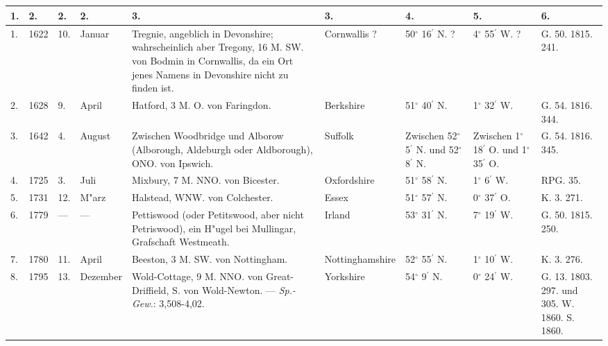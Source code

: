\documentclass[a4paper, 8pt, oneside, polutonikogreek, german]{article}
\begin{document}
\subsection{}
\subsubsection{}
\begin{center}
    \footnotesize
    \begin{longtable}{|p{3mm}|p{7mm}|p{3mm}|p{11mm}|p{30mm}|p{20mm}|p{11mm}|p{11mm}|p{11mm}|}
    \hline
        1. & 2. & 2. & 2. & 3. & 3. & 4. & 5. & 6. \\ \hline
        1. & 1622 & 10. & Januar & Tregnie, angeblich in Devonshire; wahrscheinlich aber Tregony, 16 M. SW. von Bodmin in Cornwallis, da ein Ort jenes Namens in Devonshire nicht zu finden ist. & Cornwallis ? & 50$^\circ$ 16$^\prime$ N. ? & 4$^\circ$ 55$^\prime$ W. ? & G. 50. 1815. 241. \\ \hline
        2. & 1628 & 9. & April & Hatford, 3 M. O. von Faringdon. & Berkshire & 51$^\circ$ 40$^\prime$ N. & 1$^\circ$ 32$^\prime$ W. & G. 54. 1816. 344. \\ \hline
        3. & 1642 & 4. & August & Zwischen Woodbridge und Alborow (Alborough, Aldeburgh oder Aldborough), ONO. von Ipswich. & Suffolk & Zwischen 52$^\circ$ 5$^\prime$ N. und 52$^\circ$ 8$^\prime$ N. & Zwischen 1$^\circ$ 18$^\prime$ O. und 1$^\circ$ 35$^\prime$ O. & G. 54. 1816. 345. \\ \hline
        4. & 1725 & 3. & Juli & Mixbury, 7 M. NNO. von Bicester. & Oxfordshire & 51$^\circ$ 58$^\prime$ N. & 1$^\circ$ 6$^\prime$ W. & RPG. 35. \\ \hline
        5. & 1731 & 12. & M"arz & Halstead, WNW. von Colchester. & Essex & 51$^\circ$ 57$^\prime$ N. & 0$^\circ$ 37$^\prime$ O. & K. 3. 271. \\ \hline
        6. & 1779 & --- & --- & Pettiswood (oder Petitswood, aber nicht Petriswood), ein H"ugel bei Mullingar, Grafschaft Westmeath. & Irland & 53$^\circ$ 31$^\prime$ N. & 7$^\circ$ 19$^\prime$ W. & G. 50. 1815. 250. \\ \hline
        7. & 1780 & 11. & April & Beeston, 3 M. SW. von Nottingham. & Nottinghamshire & 52$^\circ$ 55$^\prime$ N. & 1$^\circ$ 10$^\prime$ W. & K. 3. 276. \\ \hline
        8. & 1795 & 13. & Dezember & Wold-Cottage, 9 M. NNO. von Great-Driffield, S. von Wold-Newton. --- \emph{Sp.-Gew.}: 3,508-4,02. & Yorkshire & 54$^\circ$ 9$^\prime$ N. & 0$^\circ$ 24$^\prime$ W. & G. 13. 1803. 297. und 305. W. 1860. S. 1860. \\ \hline

\end{longtable}
\end{center}
\end{document}
